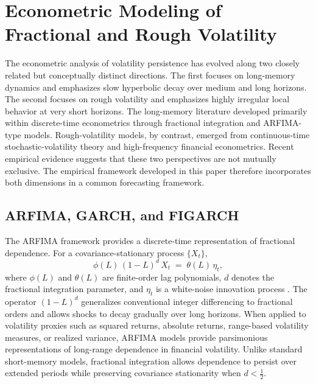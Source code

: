 \documentclass[jrfm,article,submit,moreauthors,pdftex]{Definitions/mdpi}
\begin{document}
\section{Econometric Modeling of Fractional and Rough Volatility}
\label{sec:econometrics}

The econometric analysis of volatility persistence has evolved along two
closely related but conceptually distinct directions. The first focuses on
long-memory dynamics and emphasizes slow hyperbolic decay over medium and
long horizons. The second focuses on rough volatility and emphasizes highly
irregular local behavior at very short horizons. The long-memory literature
developed primarily within discrete-time econometrics through fractional
integration and ARFIMA-type models. Rough-volatility models, by contrast,
emerged from continuous-time stochastic-volatility theory and high-frequency
financial econometrics. Recent empirical evidence suggests that these two
perspectives are not mutually exclusive. The empirical framework developed
in this paper therefore incorporates both dimensions in a common forecasting
framework.

\subsection{ARFIMA, GARCH, and FIGARCH}

The ARFIMA framework provides a discrete-time representation of fractional
dependence. For a covariance-stationary process $\{X_t\}$,
\begin{equation}
  \phi(L)\, (1-L)^d\, X_t \;=\; \theta(L)\,\eta_t,
\end{equation}
where $\phi(L)$ and $\theta(L)$ are finite-order lag polynomials, $d$
denotes the fractional integration parameter, and $\eta_t$ is a white-noise
innovation process \citep{granger1980introduction,hosking1981fractional}.
The operator $(1-L)^d$ generalizes conventional integer differencing to
fractional orders and allows shocks to decay gradually over long horizons.
When applied to volatility proxies such as squared returns, absolute
returns, range-based volatility measures, or realized variance, ARFIMA
models provide parsimonious representations of long-range dependence in
financial volatility. Unlike standard short-memory models, fractional
integration allows dependence to persist over extended periods while
preserving covariance stationarity when $d<\frac{1}{2}$.
\end{document}
